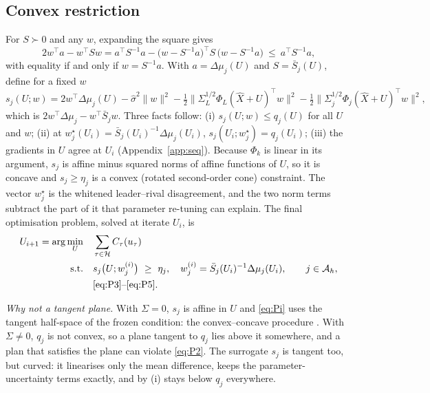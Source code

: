 \documentclass[journal,onecolumn,11pt]{IEEEtran}
\newcommand{\tp}{^{\top}}
\begin{document}
\subsection{Convex restriction}
For $S\succ0$ and any $w$, expanding the square gives \cite{boyd2004,shen2018}
\begin{equation}\label{eq:qt}
2w\tp a-w\tp Sw=a\tp S^{-1}a-\big(w-S^{-1}a\big)\tp S\,\big(w-S^{-1}a\big)\ \le\ a\tp S^{-1}a,
\end{equation}
with equality if and only if $w=S^{-1}a$. With $a=\Delta\mu_j(U)$ and $S=\bar S_j(U)$, define for a fixed $w$
\begin{equation}\label{eq:minor}
s_j(U;w)=2w\tp\Delta\mu_j(U)-\hat\sigma^2\|w\|^2-\tfrac12\big\|\Sigma_L^{1/2}\Phi_L(\hat X+U)\tp w\big\|^2-\tfrac12\big\|\Sigma_j^{1/2}\Phi_j(\hat X+U)\tp w\big\|^2,
\end{equation}
which is $2w\tp\Delta\mu_j-w\tp\bar S_jw$. Three facts follow: (i) $s_j(U;w)\le q_j(U)$ for all $U$ and $w$; (ii) at $w_j^\star(U_i)=\bar S_j(U_i)^{-1}\Delta\mu_j(U_i)$, $s_j(U_i;w_j^\star)=q_j(U_i)$; (iii) the gradients in $U$ agree at $U_i$ (Appendix~\ref{app:seq}). Because $\Phi_k$ is linear in its argument, $s_j$ is affine minus squared norms of affine functions of $U$, so it is concave and $s_j\ge\eta_j$ is a convex (rotated second-order cone) constraint. The vector $w_j^\star$ is the whitened leader--rival disagreement, and the two norm terms subtract the part of it that parameter re-tuning can explain. The final optimisation problem, solved at iterate $U_i$, is
\begin{equation}\label{eq:Pi}
\begin{aligned}
U_{i+1}=\arg\min_{U}\quad & \sum_{\tau\in\mathcal H}C_\tau(u_\tau)\\
\text{s.t.}\quad & s_j\big(U;w_j^{(i)}\big)\ \ge\ \eta_j,\quad w_j^{(i)}=\bar S_j(U_i)^{-1}\Delta\mu_j(U_i),\qquad j\in\mathcal A_h,\\
& \eqref{eq:P3}\text{--}\eqref{eq:P5}.
\end{aligned}
\end{equation}

\emph{Why not a tangent plane.} With $\Sigma=0$, $s_j$ is affine in $U$ and \eqref{eq:Pi} uses the tangent half-space of the frozen condition: the convex--concave procedure \cite{lipp2016}. With $\Sigma\ne0$, $q_j$ is not convex, so a plane tangent to $q_j$ lies above it somewhere, and a plan that satisfies the plane can violate \eqref{eq:P2}. The surrogate $s_j$ is tangent too, but curved: it linearises only the mean difference, keeps the parameter-uncertainty terms exactly, and by (i) stays below $q_j$ everywhere.
\end{document}
